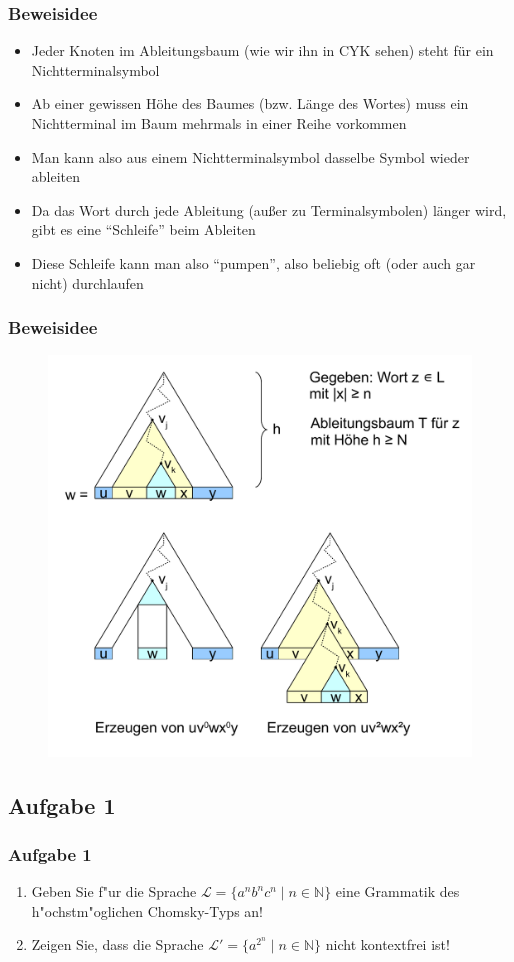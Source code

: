 \begin{frame}
	\frametitle{Beweisidee}
	\begin{itemize}
		\item Jeder Knoten im Ableitungsbaum (wie wir ihn in CYK sehen) steht für ein Nichtterminalsymbol
		\item Ab einer gewissen Höhe des Baumes (bzw. Länge des Wortes) muss ein Nichtterminal im Baum mehrmals in einer Reihe vorkommen
		\item Man kann also aus einem Nichtterminalsymbol dasselbe Symbol wieder ableiten
		\item Da das Wort durch jede Ableitung (außer zu Terminalsymbolen) länger wird, gibt es eine "`Schleife"' beim Ableiten
		\item Diese Schleife kann man also "`pumpen"', also beliebig oft (oder auch gar nicht) durchlaufen
	\end{itemize}
\end{frame}

\begin{frame}
	\frametitle{Beweisidee}
	\begin{figure}[H]
		\centering
		\includegraphics[scale=0.5]{images/pumping}
	\end{figure}
\end{frame}

\subsection{Aufgabe 1}
\begin{frame}
	\frametitle{Aufgabe 1}
	\begin{enumerate}
		\item Geben Sie f"ur die Sprache $\mathcal{L} = \{a^nb^nc^n \; | \; n \in
		\mathbb{N}\}$ eine Grammatik des h"ochstm"oglichen Chomsky-Typs an!
		\item Zeigen Sie, dass die Sprache $\mathcal{L}' = \{a^{2^n} \; | \; n \in
		\mathbb{N}\}$ nicht kontextfrei ist!
	\end{enumerate}
\end{frame}

